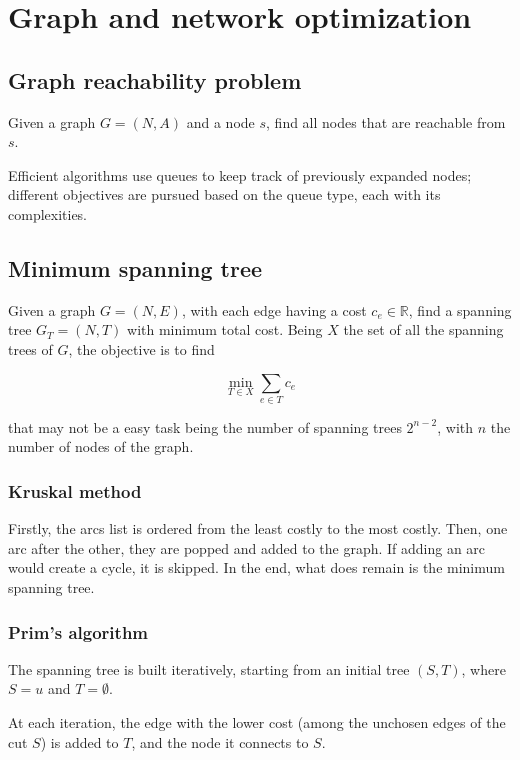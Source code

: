 \section{Graph and network optimization}

\subsection{Graph reachability problem}

Given a graph $G = (N,A)$ and a node $s$, find all nodes that are reachable from $s$.

Efficient algorithms use queues to keep track of previously expanded nodes; different objectives are pursued based on the queue type, each with its complexities.

\subsection{Minimum spanning tree}

Given a graph $G = (N,E)$, with each edge having a cost $c_e \in \mathbb{R}$, find a spanning tree $G_T = (N,T)$ with minimum total cost.
Being $X$ the set of all the spanning trees of $G$, the objective is to find

$$ \min_{T \in X} \sum_{e \in T} c_e $$

that may not be a easy task being the number of spanning trees $2^{n-2}$, with $n$ the number of nodes of the graph.

\subsubsection{Kruskal method}

Firstly, the arcs list is ordered from the least costly to the most costly.
Then, one arc after the other, they are popped and added to the graph.
If adding an arc would create a cycle, it is skipped.
In the end, what does remain is the minimum spanning tree.

\subsubsection{Prim's algorithm}

The spanning tree is built iteratively, starting from an initial tree $(S,T)$, where $S={u}$ and $T=\emptyset$.

At each iteration, the edge with the lower cost (among the unchosen edges of the cut $S$) is added to $T$, and the node it connects to $S$.

